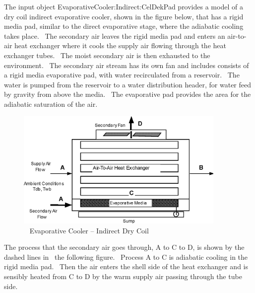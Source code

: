 The input object EvaporativeCooler:Indirect:CelDekPad provides a model of a dry coil indirect evaporative cooler, shown in the figure below, that has a rigid media pad, similar to the direct evaporative stage, where the adiabatic cooling takes place.~ The secondary air leaves the rigid media pad and enters an air-to-air heat exchanger where it cools the supply air flowing through the heat exchanger tubes.~ The moist secondary air is then exhausted to the environment.~ The secondary air stream has its own fan and includes consists of a rigid media evaporative pad, with water recirculated from a reservoir.~ The water is pumped from the reservoir to a water distribution header, for water feed by gravity from above the media.~ The evaporative pad provides the area for the adiabatic saturation of the air.

\begin{figure}[hbtp] %
\centering
\includegraphics[width=0.9\textwidth, height=0.9\textheight, keepaspectratio=true]{media/image4794.png}
\caption{  Evaporative Cooler -- Indirect Dry Coil \protect \label{fig:evaporative-cooler-indirect-dry-coil}}
\end{figure}

The process that the secondary air goes through, A to C to D, is shown by the dashed lines in~ the following figure.~ Process A to C is adiabatic cooling in the rigid media pad.~ Then the air enters the shell side of the heat exchanger and is sensibly heated from C to D by the warm supply air passing through the tube side.

